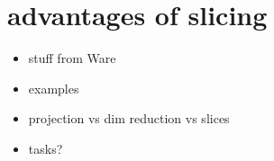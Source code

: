 \section{advantages of slicing}\label{advantages-of-slicing}

\begin{itemize}
\tightlist
\item
  stuff from Ware
\item
  examples
\item
  projection vs dim reduction vs slices
\item
  tasks?
\end{itemize}

